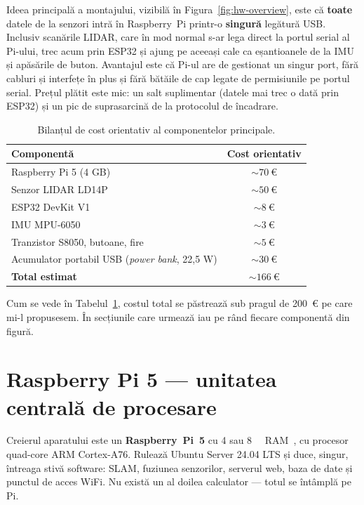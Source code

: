 \documentclass[a4paper,12pt,twoside,openany]{report}
\begin{document}
Ideea principală a montajului, vizibilă în Figura~\ref{fig:hw-overview}, este
că \textbf{toate} datele de la senzori intră în Raspberry~Pi printr-o
\textbf{singură} legătură USB. Inclusiv scanările LIDAR, care în mod normal
s-ar lega direct la portul serial al Pi-ului, trec acum prin ESP32 și ajung pe
aceeași cale ca eșantioanele de la IMU și apăsările de buton. Avantajul este
că Pi-ul are de gestionat un singur port, fără cabluri și interfețe în plus și
fără bătăile de cap legate de permisiunile pe portul serial. Prețul plătit
este mic: un salt suplimentar (datele mai trec o dată prin ESP32) și un pic de
suprasarcină de la protocolul de încadrare.

\begin{table}[H]
\centering
\caption{Bilanțul de cost orientativ al componentelor principale.}
\label{tab:bom}
\renewcommand{\arraystretch}{1.15}
\begin{tabular}{lc}
\toprule
\textbf{Componentă} & \textbf{Cost orientativ} \\
\midrule
Raspberry Pi 5 (4 GB)        & $\sim\SI{70}{\euro}$ \\
Senzor LIDAR LD14P           & $\sim\SI{50}{\euro}$ \\
ESP32 DevKit V1              & $\sim\SI{8}{\euro}$ \\
IMU MPU-6050                 & $\sim\SI{3}{\euro}$ \\
Tranzistor S8050, butoane, fire & $\sim\SI{5}{\euro}$ \\
Acumulator portabil USB (\textit{power bank}, 22,5 W) & $\sim\SI{30}{\euro}$ \\
\midrule
\textbf{Total estimat}      & $\sim\SI{166}{\euro}$ \\
\bottomrule
\end{tabular}
\end{table}

Cum se vede în Tabelul~\ref{tab:bom}, costul total se păstrează sub pragul de
\SI{200}{\euro} pe care mi-l propusesem. În secțiunile care urmează iau pe rând
fiecare componentă din figură.

\section{Raspberry Pi 5 — unitatea centrală de procesare}
\label{sec:rpi5}

Creierul aparatului este un \textbf{Raspberry~Pi~5} cu \SI{4}{} sau
\SI{8}{\giga\byte} RAM~\cite{rpi5brief}, cu procesor quad-core ARM Cortex-A76.
Rulează Ubuntu Server 24.04 LTS și duce, singur, întreaga stivă software: SLAM,
fuziunea senzorilor, serverul web, baza de date și punctul de acces WiFi. Nu
există un al doilea calculator — totul se întâmplă pe Pi.
\end{document}
